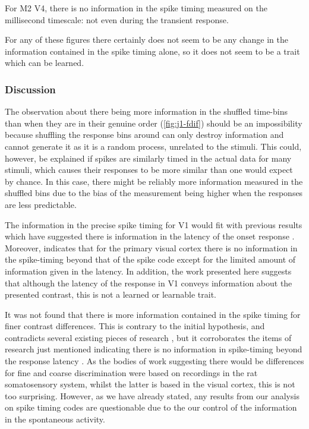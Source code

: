 For \ac{M2} \ac{V4}, there is no information in the spike timing measured on the millisecond timescale: not even during the transient response.

For any of these figures there certainly does not seem to be any change in the information contained in the spike timing alone, so it does not seem to be a trait which can be learned.



\subsubsection{Discussion}

The observation about there being more information in the shuffled time-bins than when they are in their genuine order (\autoref{fig:j1-fdif}) should be an impossibility because shuffling the response bins around can only destroy information and cannot generate it as it is a random process, unrelated to the stimuli.
This could, however, be explained if spikes are similarly timed in the actual data for many stimuli, which causes their responses to be more similar than one would expect by chance.
In this case, there might be reliably more information measured in the shuffled bins due to the bias of the measurement being higher when the responses are less predictable.

The information in the precise spike timing for \ac{V1} would fit with previous results which have suggested there is information in the latency of the onset response
\citep{Reich2001,Tovee1993,Rolls2011}.
Moreover, \citep{Tovee1993,Rolls2011} indicates that for the primary visual cortex there is no information in the spike-timing beyond that of the spike code except for the limited amount of information given in the latency.
In addition, the work presented here suggests that although the latency of the response in \ac{V1} conveys information about the presented contrast, this is not a learned or learnable trait.


It was not found that there is more information contained in the spike timing for finer contrast differences.
This is contrary to the initial hypothesis, and contradicts several existing pieces of research \citep{Reich2001,Arabzadeh2006}, but it corroborates the items of research just mentioned indicating there is no information in spike-timing beyond the response latency \citep{Reich2001,Tovee1993,Rolls2011}.
As the bodies of work suggesting there would be differences for fine and coarse discrimination were based on recordings in the rat somatosensory system, whilst the latter is based in the visual cortex, this is not too surprising.
However, as we have already stated, any results from our analysis on spike timing codes are questionable due to the our control of the information in the spontaneous activity.


